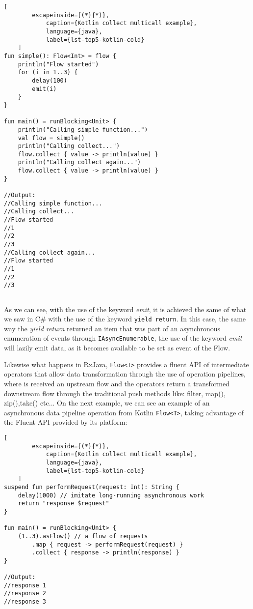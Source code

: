 \begin{center}
	\lstset{basicstyle=\scriptsize\ttfamily,frame=bottomline}
	\begin{lstlisting}[
		escapeinside={(*}{*)},
			caption={Kotlin collect multicall example},
			language={java},
			label={lst-top5-kotlin-cold}
	]
fun simple(): Flow<Int> = flow { 
	println("Flow started")
	for (i in 1..3) {
		delay(100)
		emit(i)
	}
}

fun main() = runBlocking<Unit> {
	println("Calling simple function...")
	val flow = simple()
	println("Calling collect...")
	flow.collect { value -> println(value) } 
	println("Calling collect again...")
	flow.collect { value -> println(value) } 
}

//Output:
//Calling simple function...
//Calling collect...
//Flow started
//1
//2
//3
//Calling collect again...
//Flow started
//1
//2
//3
	
	\end{lstlisting}
\end{center}

As we can see, with the use of the keyword \textit{emit}, it is achieved the same of what we saw in C\# with the use of the keyword \texttt{yield return}.
In this case, the same way the \textit{yield return} returned an item that was part of an asynchronous enumeration of events through \texttt{IAsyncEnumerable}, the use of the keyword \textit{emit} will lazily emit data, as it becomes available to be set as event of the Flow.

Likewise what happens in RxJava, \texttt{Flow<T>} provides a fluent API of intermediate operators that allow data transformation through the use of operation pipelines, where is received an upstream  flow and the operators return a transformed downstream flow through the traditional push methods like: filter, map(), zip(),take() etc... 
On the next example, we can see an example of an asynchronous data pipeline operation from Kotlin \texttt{Flow<T>}, taking advantage of the Fluent API provided by its platform:

\begin{center}
	\lstset{basicstyle=\scriptsize\ttfamily,frame=bottomline}
	\begin{lstlisting}[
		escapeinside={(*}{*)},
			caption={Kotlin collect multicall example},
			language={java},
			label={lst-top5-kotlin-cold}
	]
suspend fun performRequest(request: Int): String {
	delay(1000) // imitate long-running asynchronous work
	return "response $request"
}

fun main() = runBlocking<Unit> {
	(1..3).asFlow() // a flow of requests
		.map { request -> performRequest(request) }
		.collect { response -> println(response) }
}

//Output:
//response 1
//response 2
//response 3
	
	\end{lstlisting}
\end{center}


